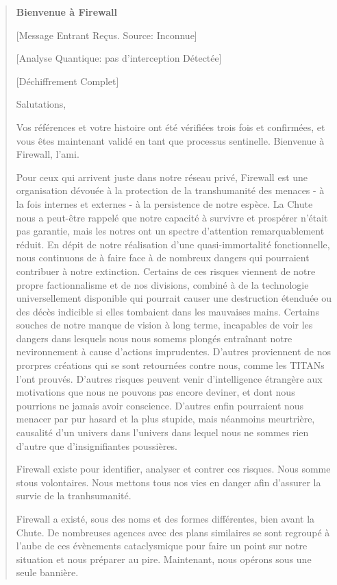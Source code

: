 \begin{quotation} 

\textbf{Bienvenue à Firewall} 

[Message Entrant Reçus. Source: Inconnue] 

[Analyse Quantique: pas d'interception Détectée] 

[Déchiffrement Complet] 

Salutations, 

Vos références et votre histoire ont été vérifiées trois fois et confirmées, et vous êtes maintenant validé en tant que processus sentinelle. Bienvenue à Firewall, l'ami. 

Pour ceux qui arrivent juste dans notre réseau privé, Firewall est une organisation dévouée à la protection de la transhumanité des menaces - à la fois internes et externes - à la persistence de notre espèce. La Chute nous a peut-être rappelé que notre capacité à survivre et prospérer n'était pas garantie, mais les notres ont un spectre d'attention remarquablement réduit. En dépit de notre réalisation d'une quasi-immortalité fonctionnelle, nous continuons de à faire face à de nombreux dangers qui pourraient contribuer à notre extinction. Certains de ces risques viennent de notre propre factionnalisme et de nos divisions, combiné à de la technologie universellement disponible qui pourrait causer une destruction étenduée ou des décès indicible si elles tombaient dans les mauvaises mains. Certains souches de notre manque de vision à long terme, incapables de voir les dangers dans lesquels nous nous somems plongés entraînant notre nevironnement à cause d'actions imprudentes. D'autres proviennent de nos prorpres créations qui se sont retournées contre nous, comme les TITANs l'ont prouvés. D'autres risques peuvent venir d'intelligence étrangère aux motivations que nous ne pouvons pas encore deviner, et dont nous pourrions ne jamais avoir conscience. D'autres enfin pourraient nous menacer par pur hasard et la plus stupide, mais néanmoins meurtrière, causalité d'un univers dans l'univers dans lequel nous ne sommes rien d'autre que d'insignifiantes poussières. 

Firewall existe pour identifier, analyser et contrer ces risques. Nous somme stous volontaires. Nous mettons tous nos vies en danger afin d'assurer la survie de la tranhsumanité. 

Firewall a existé, sous des noms et des formes différentes, bien avant la Chute. De nombreuses agences avec des plans similaires se sont regroupé à l'aube de ces évènements cataclysmique pour faire un point sur notre situation et nous préparer au pire. Maintenant, nous opérons sous une seule bannière. 


\end{quotation}
